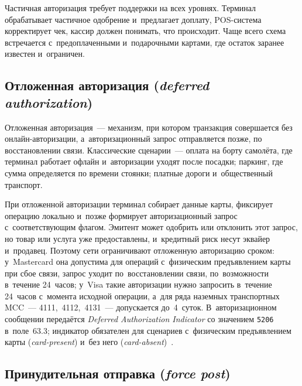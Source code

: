 Частичная авторизация требует поддержки на всех уровнях. Терминал обрабатывает
частичное одобрение и~предлагает доплату, POS-система корректирует чек, кассир
должен понимать, что происходит. Чаще всего схема встречается с~предоплаченными
и~подарочными картами, где остаток заранее известен и~ограничен.


\subsection*{Отложенная авторизация (\textit{deferred authorization})}

Отложенная авторизация~--- механизм, при котором транзакция совершается без
онлайн-авторизации, а~авторизационный запрос отправляется позже, по
восстановлении связи. Классические сценарии~--- оплата на борту самолёта, где
терминал работает офлайн и~авторизации уходят после посадки; паркинг, где сумма
определяется по времени стоянки; платные дороги и~общественный транспорт.

При отложенной авторизации терминал собирает данные карты, фиксирует
операцию локально и~позже формирует авторизационный запрос с~соответствующим
флагом. Эмитент может одобрить или отклонить этот запрос, но товар или услуга
уже предоставлены, и~кредитный риск несут эквайер и~продавец. Поэтому сети
ограничивают отложенную авторизацию сроком: у~Mastercard она допустима для
операций с~физическим предъявлением карты при сбое связи, запрос уходит
по~восстановлении связи, по~возможности в~течение 24~часов; у~Visa такие
авторизации нужно запросить в~течение 24~часов с~момента исходной операции, а~для
ряда наземных транспортных MCC~--- 4111,~4112,~4131~--- допускается
до~4~суток. В~авторизационном сообщении передаётся \textit{Deferred Authorization
Indicator} со значением \texttt{5206} в~поле~63.3; индикатор обязателен для
сценариев с~физическим предъявлением карты (\textit{card-present}) и~без
него (\textit{card-absent})~\cite{visa-tadg,visa-core-rules}.

\subsection*{Принудительная отправка (\textit{force post})}

